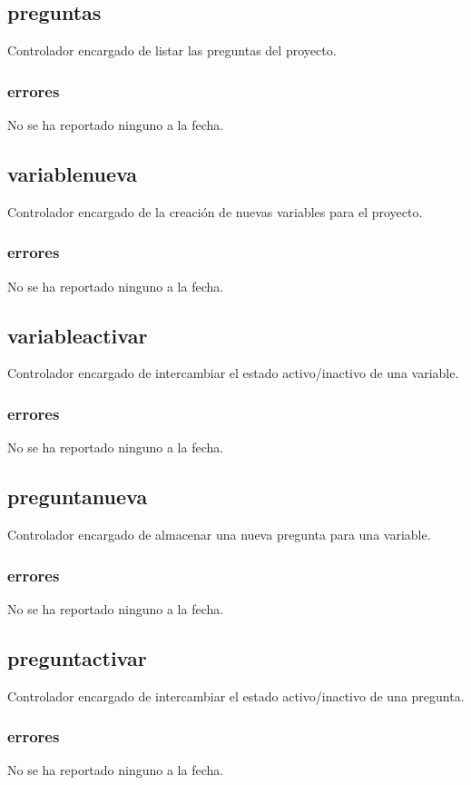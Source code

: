 \documentclass[10pt,a4paper]{book}
\begin{document}
	\subsection{preguntas}
	Controlador encargado de listar las preguntas del proyecto.
	\subsubsection{errores}
	No se ha reportado ninguno a la fecha.

	\subsection{variablenueva}
	Controlador encargado de la creación de nuevas variables para el proyecto.
	\subsubsection{errores}
	No se ha reportado ninguno a la fecha.

	\subsection{variableactivar}
	Controlador encargado de intercambiar el estado activo/inactivo de una variable.
	\subsubsection{errores}
	No se ha reportado ninguno a la fecha.

	\subsection{preguntanueva}
	Controlador encargado de almacenar una nueva pregunta para una variable.
	\subsubsection{errores}
	No se ha reportado ninguno a la fecha.

	\subsection{preguntactivar}
	Controlador encargado de intercambiar el estado activo/inactivo de una pregunta.
	\subsubsection{errores}
	No se ha reportado ninguno a la fecha.
	
\end{document}
